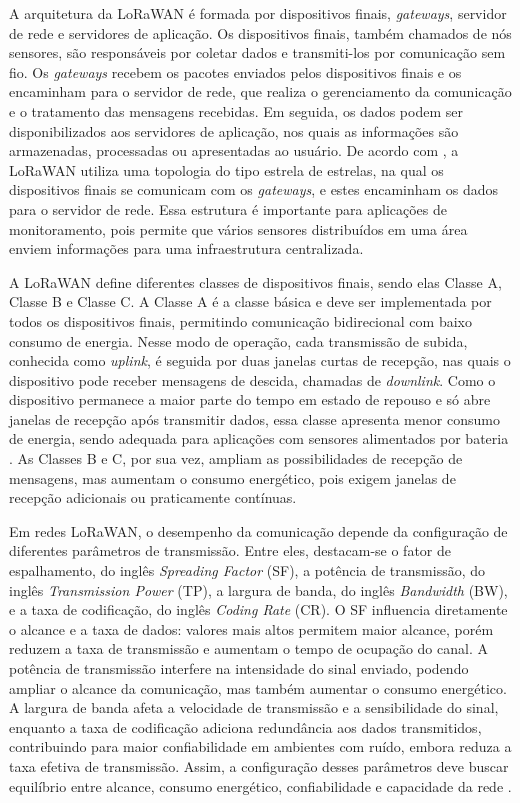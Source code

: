 A arquitetura da LoRaWAN é formada por dispositivos finais, \textit{gateways}, servidor de rede e servidores de aplicação. Os dispositivos finais, também chamados de nós sensores, são responsáveis por coletar dados e transmiti-los por comunicação sem fio. Os \textit{gateways} recebem os pacotes enviados pelos dispositivos finais e os encaminham para o servidor de rede, que realiza o gerenciamento da comunicação e o tratamento das mensagens recebidas. Em seguida, os dados podem ser disponibilizados aos servidores de aplicação, nos quais as informações são armazenadas, processadas ou apresentadas ao usuário. De acordo com , a LoRaWAN utiliza uma topologia do tipo estrela de estrelas, na qual os dispositivos finais se comunicam com os \textit{gateways}, e estes encaminham os dados para o servidor de rede. Essa estrutura é importante para aplicações de monitoramento, pois permite que vários sensores distribuídos em uma área enviem informações para uma infraestrutura centralizada.

A LoRaWAN define diferentes classes de dispositivos finais, sendo elas Classe A, Classe B e Classe C. A Classe A é a classe básica e deve ser implementada por todos os dispositivos finais, permitindo comunicação bidirecional com baixo consumo de energia. Nesse modo de operação, cada transmissão de subida, conhecida como \textit{uplink}, é seguida por duas janelas curtas de recepção, nas quais o dispositivo pode receber mensagens de descida, chamadas de \textit{downlink}. Como o dispositivo permanece a maior parte do tempo em estado de repouso e só abre janelas de recepção após transmitir dados, essa classe apresenta menor consumo de energia, sendo adequada para aplicações com sensores alimentados por bateria \cite{loraalliance2020}. As Classes B e C, por sua vez, ampliam as possibilidades de recepção de mensagens, mas aumentam o consumo energético, pois exigem janelas de recepção adicionais ou praticamente contínuas.

Em redes LoRaWAN, o desempenho da comunicação depende da configuração de diferentes parâmetros de transmissão. Entre eles, destacam-se o fator de espalhamento, do inglês \textit{Spreading Factor} (SF), a potência de transmissão, do inglês \textit{Transmission Power} (TP), a largura de banda, do inglês \textit{Bandwidth} (BW), e a taxa de codificação, do inglês \textit{Coding Rate} (CR). O SF influencia diretamente o alcance e a taxa de dados: valores mais altos permitem maior alcance, porém reduzem a taxa de transmissão e aumentam o tempo de ocupação do canal. A potência de transmissão interfere na intensidade do sinal enviado, podendo ampliar o alcance da comunicação, mas também aumentar o consumo energético. A largura de banda afeta a velocidade de transmissão e a sensibilidade do sinal, enquanto a taxa de codificação adiciona redundância aos dados transmitidos, contribuindo para maior confiabilidade em ambientes com ruído, embora reduza a taxa efetiva de transmissão. Assim, a configuração desses parâmetros deve buscar equilíbrio entre alcance, consumo energético, confiabilidade e capacidade da rede \cite{sarmentoneto2025}.

